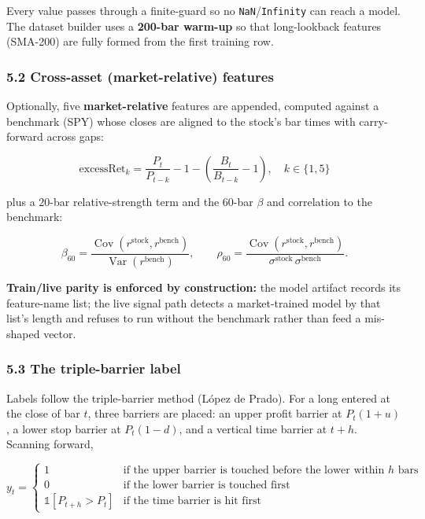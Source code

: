 \documentclass[
  11pt,
]{article}
\begin{document}
Every value passes through a finite-guard so no
\texttt{NaN}/\texttt{Infinity} can reach a model. The dataset builder
uses a \textbf{200-bar warm-up} so that long-lookback features (SMA-200)
are fully formed from the first training row.

\subsubsection{5.2 Cross-asset (market-relative)
features}\label{cross-asset-market-relative-features}

Optionally, five \textbf{market-relative} features are appended,
computed against a benchmark (SPY) whose closes are aligned to the
stock's bar times with carry-forward across gaps:

\[
\text{excessRet}_k = \frac{P_t}{P_{t-k}} - 1 - \left(\frac{B_t}{B_{t-k}} - 1\right),\quad k \in \{1,5\}
\]

plus a 20-bar relative-strength term and the 60-bar \(\beta\) and
correlation to the benchmark:

\[
\beta_{60} = \frac{\operatorname{Cov}(r^{\text{stock}}, r^{\text{bench}})}{\operatorname{Var}(r^{\text{bench}})},\qquad
\rho_{60} = \frac{\operatorname{Cov}(r^{\text{stock}}, r^{\text{bench}})}{\sigma^{\text{stock}}\,\sigma^{\text{bench}}}.
\]

\textbf{Train/live parity is enforced by construction:} the model
artifact records its feature-name list; the live signal path detects a
market-trained model by that list's length and refuses to run without
the benchmark rather than feed a mis-shaped vector.

\subsubsection{5.3 The triple-barrier
label}\label{the-triple-barrier-label}

Labels follow the triple-barrier method (López de Prado). For a long
entered at the close of bar \(t\), three barriers are placed: an upper
profit barrier at \(P_t(1+u)\), a lower stop barrier at \(P_t(1-d)\),
and a vertical time barrier at \(t+h\). Scanning forward,

\[
y_t = \begin{cases}
1 & \text{if the upper barrier is touched before the lower within } h \text{ bars}\\
0 & \text{if the lower barrier is touched first}\\
\mathbb{1}[P_{t+h} > P_t] & \text{if the time barrier is hit first}
\end{cases}
\]
\end{document}

